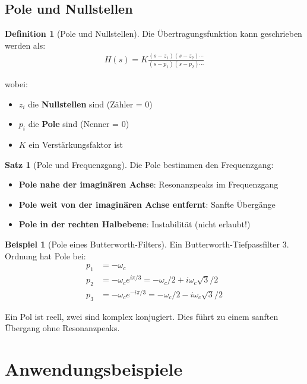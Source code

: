 ﻿\documentclass[a4paper,12pt]{report}
\theoremstyle{definition}
\newtheorem{definition}{Definition}
\newtheorem{beispiel}{Beispiel}
\newtheorem{satz}{Satz}
\begin{document}
	\subsection{Pole und Nullstellen}
	
	\begin{definition}[Pole und Nullstellen]
		Die Übertragungsfunktion kann geschrieben werden als:
		\begin{align}
			H(s) = K \frac{(s - z_1)(s - z_2) \cdots}{(s - p_1)(s - p_2) \cdots}
		\end{align}
		
		wobei:
		\begin{itemize}
			\item[-] $z_i$ die \textbf{Nullstellen} sind (Zähler = 0)
			\item[-] $p_i$ die \textbf{Pole} sind (Nenner = 0)
			\item[-] $K$ ein Verstärkungsfaktor ist
		\end{itemize}
	\end{definition}
	
	\begin{satz}[Pole und Frequenzgang]
		Die Pole bestimmen den Frequenzgang:
		\begin{itemize}
			\item[-] \textbf{Pole nahe der imaginären Achse}: Resonanzpeaks im Frequenzgang
			\item[-] \textbf{Pole weit von der imaginären Achse entfernt}: Sanfte Übergänge
			\item[-] \textbf{Pole in der rechten Halbebene}: Instabilität (nicht erlaubt!)
		\end{itemize}
	\end{satz}
	
	\begin{beispiel}[Pole eines Butterworth-Filters]
		Ein Butterworth-Tiefpassfilter 3. Ordnung hat Pole bei:
		\begin{align}
			p_1 &= -\omega_c \\
			p_2 &= -\omega_c e^{i\pi/3} = -\omega_c/2 + i\omega_c\sqrt{3}/2 \\
			p_3 &= -\omega_c e^{-i\pi/3} = -\omega_c/2 - i\omega_c\sqrt{3}/2
		\end{align}
		
		Ein Pol ist reell, zwei sind komplex konjugiert. Dies führt zu einem sanften Übergang ohne Resonanzpeaks.
	\end{beispiel}
	
	\section{Anwendungsbeispiele}
	
\end{document}
